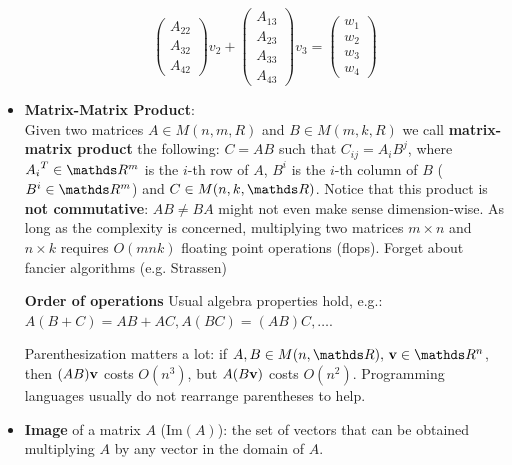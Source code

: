 \documentclass[computationalMathematics.tex]{subfiles}
\begin{document}
\begin{itemize}
\[\begin{pmatrix}
                A_{22}\\
                A_{32}\\
                A_{42}
        \end{pmatrix}v_2 + 
        \begin{pmatrix}
                A_{13}\\
                A_{23}\\
                A_{33}\\
                A_{43}
        \end{pmatrix}v_3 =
        \begin{pmatrix}
                  w_1\\
                  w_2\\
                  w_3\\
                  w_4
        \end{pmatrix}
      \]
  \item \textbf{Matrix-Matrix Product}:\\
        Given two matrices $A \in M(n, m, R)$ and $B \in M(m, k, R)$ we call \textbf{matrix-matrix product} the following:
        $C=AB$ such that $C_{ij} = A_i B^j$, where $\tr{A_i} \in \R^m$ is the $i$-th row of $A$, $B^i$ is the $i$-th column of $B$ ($B^i \in \R^m$) and $C \in M(n, k, \R)$.
        Notice that this product is \textbf{not commutative}: $AB \neq BA$ might not even make sense dimension-wise.
		As long as the complexity is concerned, multiplying two matrices $m \times n$ and $n \times k$ requires $O(m n k)$ floating point operations (flops). Forget about fancier algorithms (e.g. Strassen)
		        
		\begin{myframe}{\bf Order of operations}
		  Usual algebra properties hold, e.g.: $A(B + C) = AB + AC, A(BC) = (AB)C, \ldots$.
		  
		  Parenthesization matters a lot: if $A, B \in M(n, \R), \, \vect{v} \in \R^n$, then $(AB){\bf v }$ costs $O(n^3)$, but $A(B{\bf v })$ costs $O(n^2)$.
		  Programming languages usually do not rearrange parentheses to help.
		\end{myframe}

     \item \textbf{Image} of a matrix $A$ ($\text{Im}(A)$):  the set of vectors that can    be obtained multiplying $A$ by any vector in the domain of $A$.


\end{itemize}
\end{document}
